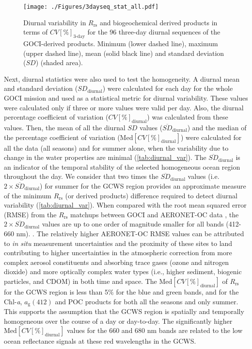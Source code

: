 \documentclass[remotesensing,article,submit,moreauthors,pdftex,10pt,a4paper]{Definitions/mdpi}
\begin{document}
\begin{figure}[htbp!]
\centering
\texttt{[image: ./Figures/3dayseq\_stat\_all.pdf]}
\caption{Diurnal variability in $R_\text{rs}$ and biogeochemical derived products in terms of $CV[\%]_\text{3-day}$ for the 96 three-day diurnal sequences of the GOCI-derived products. Minimum (lower dashed line), maximum (upper dashed line), mean (solid black line) and standard deviation ($SD$) (shaded area).\label{fig:3dayseq_stats} } 
\end{figure}
Next, diurnal statistics were also used to test the homogeneity. A diurnal mean and standard deviation ($SD_\text{diurnal}$) were calculated for each day for the whole GOCI mission and used as a statistical metric for diurnal variability. These values were calculated only if three or more values were valid per day. Also, the diurnal percentage coefficient of variation ($CV[\%]_\text{diurnal}$) was calculated from these values. Then, the mean of all the diurnal $SD$ values ($\overline{SD}_\text{diurnal}$) and the median of the percentage coefficient of variation ($\text{Med}[CV[\%]_\text{diurnal}]$) were calculated for all the data (all seasons) and for summer alone, when the variability due to change in the water properties are minimal (\autoref{tab:diurnal_var}). The $\overline{SD}_\text{diurnal}$ is an indicator of the temporal stability of the selected homogeneous ocean region throughout the day. We consider that two times the $\overline{SD}_\text{diurnal}$ values (i.e. $2\times \overline{SD}_\text{diurnal}$) for summer for the GCWS region provides an approximate measure of the minimum $R_\text{rs}$ (or derived products) difference required to detect diurnal variability (\autoref{tab:diurnal_var}). When compared with the root mean squared error (RMSE) from the $R_\text{rs}$ matchups between GOCI and AERONET-OC data \cite{Concha_2018a}, the $2\times \overline{SD}_\text{diurnal}$ values are up to one order of magnitude smaller for all bands (412-660 nm). . The relatively higher AERONET-OC RMSE values can be attributed to {\it in situ} measurement uncertainties and the proximity of these sites to land contributing to higher uncertainties in the atmospheric correction from more complex aerosol constituents and absorbing trace gases (ozone and nitrogen dioxide) and more optically complex water types (i.e., higher sediment, biogenic particles, and CDOM) in both time and space. The $\text{Med}[CV[\%]_\text{diurnal}]$ of $R_\text{rs}$ for the GCWS region is less than 5\% for the blue and green bands, and for the Chl-{\it a}, $a_\text{g}(412)$ and POC products for both all the seasons and only summer. This supports the assumption that the GCWS region is spatially and temporally homogeneous over the course of a day or day-to-day. The significantly higher $\text{Med}[CV[\%]_\text{diurnal}]$ values for the 660 and 680 nm bands are related to the low ocean reflectance signals at these red wavelengths in the GCWS. 
\end{document}
